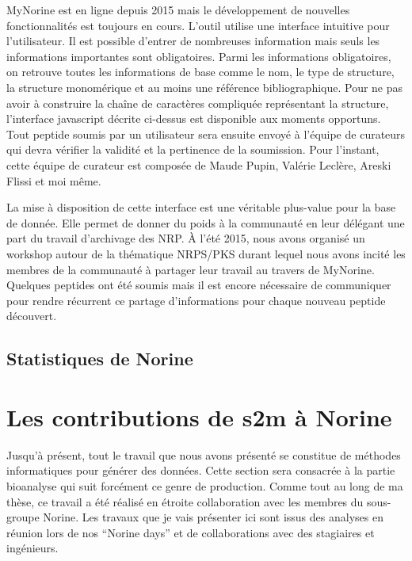 MyNorine est en ligne depuis 2015 mais le développement de nouvelles fonctionnalités est toujours en cours.
L'outil utilise une interface intuitive pour l'utilisateur.
Il est possible d'entrer de nombreuses information mais seuls les informations importantes sont obligatoires.
Parmi les informations obligatoires, on retrouve toutes les informations de base comme le nom, le type de structure, la structure monomérique et au moins une référence bibliographique.
Pour ne pas avoir à construire la chaîne de caractères compliquée représentant la structure, l'interface javascript décrite ci-dessus est disponible aux moments opportuns.
Tout peptide soumis par un utilisateur sera ensuite envoyé à l'équipe de curateurs qui devra vérifier la validité et la pertinence de la soumission.
Pour l'instant, cette équipe de curateur est composée de Maude Pupin, Valérie Leclère, Areski Flissi et moi même.

La mise à disposition de cette interface est une véritable plus-value pour la base de donnée.
Elle permet de donner du poids à la communauté en leur délégant une part du travail d'archivage des NRP.
À l'été 2015, nous avons organisé un workshop autour de la thématique NRPS/PKS durant lequel nous avons incité les membres de la communauté à partager leur travail au travers de MyNorine.
Quelques peptides ont été soumis mais il est encore nécessaire de communiquer pour rendre récurrent ce partage d'informations pour chaque nouveau peptide découvert.


\subsection{Statistiques de Norine}








\section{Les contributions de s2m à Norine}

Jusqu'à présent, tout le travail que nous avons présenté se constitue de méthodes informatiques pour générer des données.
Cette section sera consacrée à la partie bioanalyse qui suit forcément ce genre de production.
Comme tout au long de ma thèse, ce travail a été réalisé en étroite collaboration avec les membres du sous-groupe Norine.
Les travaux que je vais présenter ici sont issus des analyses en réunion lors de nos ``Norine days'' et de collaborations avec des stagiaires et ingénieurs.

